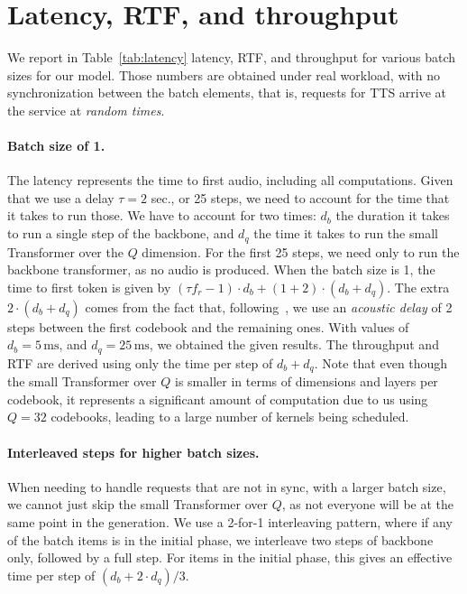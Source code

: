 \section{Latency, RTF, and throughput}
\label{sec:app:latency}

We report in Table~\ref{tab:latency} latency, RTF, and throughput
for various batch sizes for our model. Those numbers are obtained under
real workload, with no synchronization between the batch elements,
that is, requests for TTS arrive at the service at \emph{random times}.

\paragraph{Batch size of 1.}
The latency represents the time to first audio, including all computations. Given that we use a delay $\tau=2$ sec., or 25 steps, we need to account for the time that it takes to run those.
We have to account for two times: $d_b$ the duration it takes
to run a single step of the backbone, and $d_q$ the time it takes to run
the small Transformer over the $Q$ dimension. For the first 25 steps, we need only to run the backbone transformer, as no audio is produced.
When the batch size is 1, the time to first token is given by $(\tau f_r - 1) \cdot d_b + (1 + 2)\cdot (d_b + d_q)$.  The extra $2\cdot (d_b + d_q)$ comes from the fact that, following~\citet{moshi}, we use an \emph{acoustic delay} of 2 steps between the first codebook and the remaining ones.
With values of $d_b=5\,\text{ms}$, and $d_q=25\,\text{ms}$, we obtained the given results. The throughput and RTF are derived using only the time per step of $d_b + d_q$.
Note that even though the small Transformer over $Q$ is smaller in terms of dimensions and layers per codebook, it represents a significant amount of computation due to us using $Q=32$ codebooks, leading to a large number of kernels being scheduled.

\paragraph{Interleaved steps for higher batch sizes.} 
When needing to handle requests that are not in sync, with a larger batch size, we cannot just skip the small Transformer over $Q$, as not everyone will be at the same point in the generation. We use a 2-for-1 interleaving pattern, where if any of the batch items is in the initial phase,
we interleave two steps of backbone only, followed by a full step.
For items in the initial phase, this gives an effective time per step
of $(d_b + 2 \cdot d_q) / 3$.

